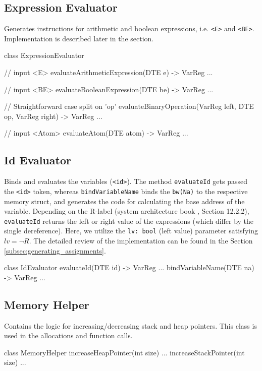 \subsection{Expression Evaluator}
Generates instructions for arithmetic and boolean expressions, i.e. \verb+<E>+ and \verb+<BE>+.
Implementation is described later in the section.
\begin{codeblock}
class ExpressionEvaluator {
    // input <E>
    evaluateArithmeticExpression(DTE e) -> VarReg { ... }

    // input <BE>
    evaluateBooleanExpression(DTE be) -> VarReg { ... }

    // Straightforward case split on 'op'
    evaluateBinaryOperation(VarReg left, DTE op, VarReg right) -> VarReg { ... }

    // input <Atom>
    evaluateAtom(DTE atom) -> VarReg { ... }
}
\end{codeblock}

\subsection{Id Evaluator}
Binds and evaluates the variables (\verb+<id>+). The method \verb+evaluateId+ gets passed the \verb+<id>+ token,
whereas \verb+bindVariableName+ binds the \verb+bw(Na)+ to the respective memory struct, and generates the code for
calculating the base address of the variable. Depending on the R-label (system architecture book \cite{sysbook}, Section 12.2.2),
\verb+evaluateId+ returns the left or right value of the expressions (which differ by the single dereference). Here, we utilize
the \verb+lv: bool+ (left value) parameter satisfying $lv = \neg R$. The detailed review of the implementation can be found in the Section \ref{subsec:generating_assignments}.
\newpage
\begin{codeblock}
class IdEvaluator {
    evaluateId(DTE id) -> VarReg { ... }
    bindVariableName(DTE na) -> VarReg { ... }
}
\end{codeblock}
\subsection{Memory Helper}
Contains the logic for increasing/decreasing stack and heap pointers. This class is used in the allocations and function calls.
\begin{codeblock}
class MemoryHelper {
    increaseHeapPointer(int size) { ... }
    increaseStackPointer(int size) { ... }
}
\end{codeblock}
